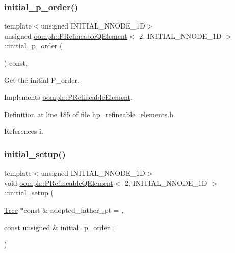 \subsubsection{\texorpdfstring{initial\+\_\+p\+\_\+order()}{initial\_p\_order()}}
{\footnotesize\ttfamily template$<$unsigned I\+N\+I\+T\+I\+A\+L\+\_\+\+N\+N\+O\+D\+E\+\_\+1D$>$ \\
unsigned \hyperlink{classoomph_1_1PRefineableQElement}{oomph\+::\+P\+Refineable\+Q\+Element}$<$ 2, I\+N\+I\+T\+I\+A\+L\+\_\+\+N\+N\+O\+D\+E\+\_\+1D $>$\+::initial\+\_\+p\+\_\+order (\begin{DoxyParamCaption}{ }\end{DoxyParamCaption}) const\hspace{0.3cm}{\ttfamily [inline]}, {\ttfamily [virtual]}}



Get the initial P\+\_\+order. 



Implements \hyperlink{classoomph_1_1PRefineableElement_a6babd48e981414ad54cbfc1d89977f43}{oomph\+::\+P\+Refineable\+Element}.



Definition at line 185 of file hp\+\_\+refineable\+\_\+elements.\+h.



References i.

\mbox{\label{classoomph_1_1PRefineableQElement_3_012_00_01INITIAL__NNODE__1D_01_4_a8f5e49dc263238c79f8f924fdb6d035d}} 
\subsubsection{\texorpdfstring{initial\+\_\+setup()}{initial\_setup()}}
{\footnotesize\ttfamily template$<$unsigned I\+N\+I\+T\+I\+A\+L\+\_\+\+N\+N\+O\+D\+E\+\_\+1D$>$ \\
void \hyperlink{classoomph_1_1PRefineableQElement}{oomph\+::\+P\+Refineable\+Q\+Element}$<$ 2, I\+N\+I\+T\+I\+A\+L\+\_\+\+N\+N\+O\+D\+E\+\_\+1D $>$\+::initial\+\_\+setup (\begin{DoxyParamCaption}\item[{\hyperlink{classoomph_1_1Tree}{Tree} $\ast$const \&}]{adopted\+\_\+father\+\_\+pt = {},  }\item[{const unsigned \&}]{initial\+\_\+p\+\_\+order = {} }\end{DoxyParamCaption})\hspace{0.3cm}{\ttfamily [virtual]}}



